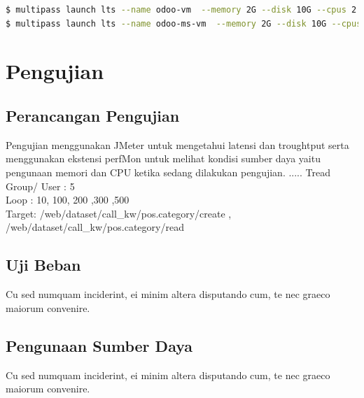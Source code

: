 \begin{lstlisting}[style=mystyle, language=sh, caption={Pembuatan VM untuk Deployment }]
$ multipass launch lts --name odoo-vm  --memory 2G --disk 10G --cpus 2
$ multipass launch lts --name odoo-ms-vm  --memory 2G --disk 10G --cpus 2
\end{lstlisting} 

\section{Pengujian}
\subsection{Perancangan Pengujian}
Pengujian menggunakan JMeter untuk mengetahui latensi dan troughtput serta menggunakan ekstensi perfMon untuk melihat kondisi sumber daya yaitu pengunaan memori dan CPU ketika sedang dilakukan pengujian. 
.....
Tread Group/ User : 5 \\
Loop : 10, 100, 200 ,300 ,500 \\
Target:  /web/dataset/call\_kw/pos.category/create , /web/dataset/call\_kw/pos.category/read \\

\subsection{Uji Beban}

Cu sed numquam inciderint, ei minim altera disputando cum, te nec graeco maiorum convenire.\\
\subsection{Pengunaan Sumber Daya}
Cu sed numquam inciderint, ei minim altera disputando cum, te nec graeco maiorum convenire.\\